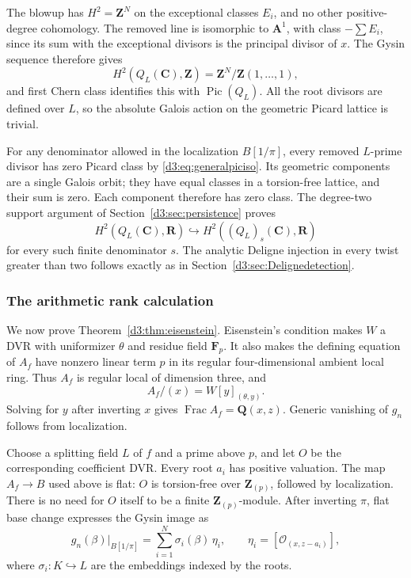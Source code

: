 \documentclass[11pt,a4paper]{amsart}
\numberwithin{equation}{section}
\theoremstyle{definition}
\theoremstyle{remark}
\newcommand{\Q}{\mathbf Q}
\newcommand{\Z}{\mathbf Z}
\newcommand{\R}{\mathbf R}
\newcommand{\C}{\mathbf C}
\newcommand{\F}{\mathbf F}
\newcommand{\A}{\mathbf A}
\newcommand{\OO}{\mathcal O}
\newcommand{\Pic}{\operatorname{Pic}}
\newcommand{\Frac}{\operatorname{Frac}}
\begin{document}
The blowup has $H^2=\Z^N$ on the exceptional classes $E_i$, and no other positive-degree cohomology. The removed line is isomorphic to $\A^1$, with class $-\sum E_i$, since its sum with the exceptional divisors is the principal divisor of $x$. The Gysin sequence therefore gives
\[
H^2(Q_L(\C),\Z)=\Z^N/\Z(1,\ldots,1),
\]
and first Chern class identifies this with $\Pic(Q_L)$. All the root divisors are defined over $L$, so the absolute Galois action on the geometric Picard lattice is trivial.

For any denominator allowed in the localization $B[1/\pi]$, every removed $L$-prime divisor has zero Picard class by \eqref{d3:eq:generalpiciso}. Its geometric components are a single Galois orbit; they have equal classes in a torsion-free lattice, and their sum is zero. Each component therefore has zero class. The degree-two support argument of Section~\ref{d3:sec:persistence} proves
\[
H^2(Q_L(\C),\R)\hookrightarrow H^2((Q_L)_s(\C),\R)
\]
for every such finite denominator $s$. The analytic Deligne injection in every twist greater than two follows exactly as in Section~\ref{d3:sec:Delignedetection}.

\subsubsection{The arithmetic rank calculation}

We now prove Theorem~\ref{d3:thm:eisenstein}. Eisenstein's condition makes $W$ a DVR with uniformizer $\theta$ and residue field $\F_p$. It also makes the defining equation of $A_f$ have nonzero linear term $p$ in its regular four-dimensional ambient local ring. Thus $A_f$ is regular local of dimension three, and
\[
A_f/(x)=W[y]_{(\theta,y)}.
\]
Solving for $y$ after inverting $x$ gives $\Frac A_f=\Q(x,z)$. Generic vanishing of $g_n$ follows from localization.

Choose a splitting field $L$ of $f$ and a prime above $p$, and let $O$ be the corresponding coefficient DVR. Every root $a_i$ has positive valuation. The map $A_f\to B$ used above is flat: $O$ is torsion-free over $\Z_{(p)}$, followed by localization. There is no need for $O$ itself to be a finite $\Z_{(p)}$-module. After inverting $\pi$, flat base change expresses the Gysin image as
\begin{equation}\label{d3:eq:generalbasechange}
g_n(\beta)|_{B[1/\pi]}=
\sum_{i=1}^N \sigma_i(\beta)\,\eta_i,
\qquad \eta_i=[\OO_{(x,z-a_i)}],
\end{equation}
where $\sigma_i:K\hookrightarrow L$ are the embeddings indexed by the roots.
\end{document}
